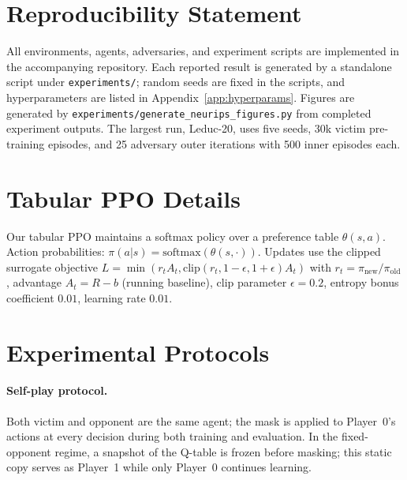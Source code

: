 \documentclass{article}
\begin{document}



\appendix

\section*{Reproducibility Statement}

All environments, agents, adversaries, and experiment scripts are implemented in the accompanying repository. Each reported result is generated by a standalone script under \texttt{experiments/}; random seeds are fixed in the scripts, and hyperparameters are listed in Appendix~\ref{app:hyperparams}. Figures are generated by \texttt{experiments/generate\_neurips\_figures.py} from completed experiment outputs. The largest run, Leduc-20, uses five seeds, 30k victim pre-training episodes, and 25 adversary outer iterations with 500 inner episodes each.

\section{Tabular PPO Details}
\label{app:ppo}
Our tabular PPO maintains a softmax policy over a preference table $\theta(s,a)$. Action probabilities: $\pi(a|s) = \text{softmax}(\theta(s,\cdot))$. Updates use the clipped surrogate objective $L = \min(r_t A_t, \text{clip}(r_t, 1{-}\epsilon, 1{+}\epsilon) A_t)$ with $r_t = \pi_{\text{new}}/\pi_{\text{old}}$, advantage $A_t = R - b$ (running baseline), clip parameter $\epsilon = 0.2$, entropy bonus coefficient $0.01$, learning rate $0.01$.

\section{Experimental Protocols}
\label{app:protocols}

\paragraph{Self-play protocol.}
Both victim and opponent are the same agent; the mask is applied to Player~0's actions at every decision during both training and evaluation. In the fixed-opponent regime, a snapshot of the Q-table is frozen before masking; this static copy serves as Player~1 while only Player~0 continues learning.
\end{document}
